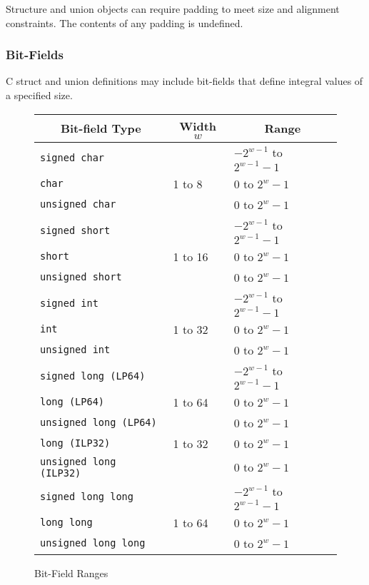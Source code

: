 Structure and union objects can require padding to meet size and
alignment constraints.  The contents of any padding is undefined.


\subsubsection{Bit-Fields}

C struct and union definitions may include bit-fields that define
integral values of a specified size.

\begin{figure}[h]
\Hrule
  \caption{Bit-Field Ranges}
  \begin{center}
    \leavevmode
    \begin{tabular}{l|l|l}
      \multicolumn{1}{c}{Bit-field Type}
         & \multicolumn{1}{c}{Width $w$}
         & \multicolumn{1}{c}{Range} \\
      \hline
      \texttt{signed char} & & $-2^{w - 1}$ to $2^{w-1}-1$ \\
      \texttt{char} & 1 to 8 & 0 to $2^{w}-1$ \\
      \texttt{unsigned char} & & 0 to $2^{w}-1$ \\
      \hline
      \texttt{signed short} & & $-2^{w - 1}$ to $2^{w-1}-1$ \\
      \texttt{short} & 1 to 16 & 0 to $2^{w}-1$ \\
      \texttt{unsigned short} & & 0 to $2^{w}-1$ \\
      \hline
      \texttt{signed int} & & $-2^{w - 1}$ to $2^{w-1}-1$ \\
      \texttt{int} & 1 to 32 & 0 to $2^{w}-1$ \\
      \texttt{unsigned int} & & 0 to $2^{w}-1$ \\
      \hline
      \texttt{signed long (LP64)} & & $-2^{w - 1}$ to $2^{w-1}-1$ \\
      \texttt{long (LP64)} & 1 to 64 & 0 to $2^{w}-1$ \\
      \texttt{unsigned long (LP64)} & & 0 to $2^{w}-1$ \\
      \hline
      \texttt{long (ILP32)} & 1 to 32 & 0 to $2^{w}-1$ \\
      \texttt{unsigned long (ILP32)} & & 0 to $2^{w}-1$ \\
      \hline
      \texttt{signed long long} & & $-2^{w - 1}$ to $2^{w-1}-1$ \\
      \texttt{long long} & 1 to 64 & 0 to $2^{w}-1$ \\
      \texttt{unsigned long long} & & 0 to $2^{w}-1$ \\
    \end{tabular}
  \end{center}
\Hrule
\end{figure}

